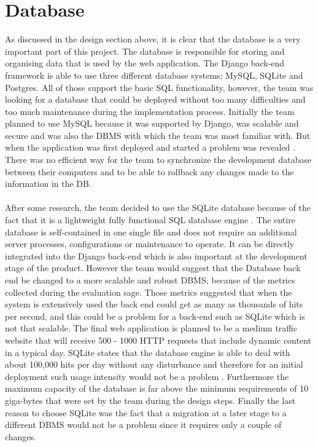 \documentclass{l3proj}
\begin{document}
\section{Database}
As discussed in the design section above, it is clear that the database is a very important part of this project. The database is responsible for storing and organising data that is used by the web application. The Django back-end framework is able to use three different database systems; MySQL, SQLite and Postgres. All of those support the basic SQL functionality, however, the team was looking for a database that could be deployed without too many difficulties and too much maintenance during the implementation process. Initially the team planned to use MySQL because it was supported by Django, was scalable and secure and was also the DBMS with which the team was most familiar with. But when the application was first deployed and started a problem was revealed \cite{sql}. There was no efficient way for the team to synchronize the development database between their computers and to be able to rollback any changes made to the information in the DB.\\
\\After some research, the team decided to use the SQLite database because of the fact that it is a lightweight fully functional SQL database engine \cite{sql}. The entire database is self-contained in one single file and does not require an additional server processes, configurations or maintenance to operate. It can be directly integrated into the Django back-end which is also important at the development stage of the product. However the team would suggest that the Database back end be changed to a more scalable and robust DBMS, because of the metrics collected during the evaluation sage. Those metrics suggested that when the system is extensively used the back end could get as many as thousands of hits per second, and this could be a problem for a back-end such as SQLite which is not that scalable. The final web application is planned to be a medium traffic website that will receive 500 - 1000 HTTP requests that include dynamic content in a typical day. SQLite states that the database engine is able to deal with about 100,000 hits per day without any disturbance and therefore for an initial deployment such usage intensity would not be a problem \cite{sql}. Furthermore the maximum capacity of the database is far above the minimum requirements of 10 giga-bytes that were set by the team during the design steps. Finally the last reason to choose SQLite was the fact that a migration at a later stage to a different DBMS would not be a problem since it requires only a couple of changes.\\
\end{document}
